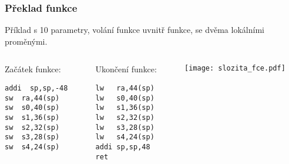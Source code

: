 \documentclass{beamer}
\begin{document}
\begin{frame}[fragile,shrink=5]
\frametitle{Překlad funkce}

Příklad s 10 parametry, volání funkce uvnitř funkce, se dvěma lokálními proměnými.

\begin{columns}
\begin{column}{0.32\textwidth}
Začátek funkce:

\begin{verbatim}
addi  sp,sp,-48
sw  ra,44(sp)
sw  s0,40(sp)
sw  s1,36(sp)
sw  s2,32(sp)
sw  s3,28(sp)
sw  s4,24(sp)
\end{verbatim}
\end{column}   
\begin{column}{0.32\textwidth}
Ukončení funkce:

\begin{verbatim}
lw   ra,44(sp)
lw   s0,40(sp)
lw   s1,36(sp)
lw   s2,32(sp)
lw   s3,28(sp)
lw   s4,24(sp)
addi sp,sp,48
ret
\end{verbatim}
\end{column}
\begin{column}{0.35\textwidth}  
\texttt{[image: slozita\_fce.pdf]}
\end{column}
\end{columns}
\end{frame}
\end{document}
